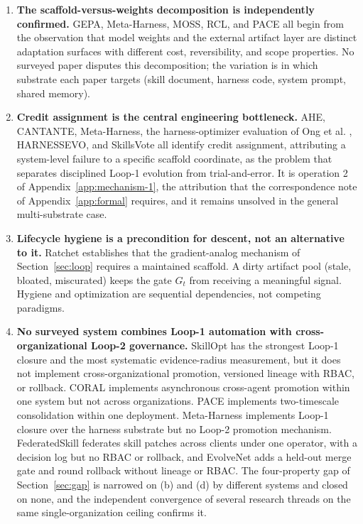 \documentclass[
  11pt,
]{article}
\newcounter{none} %
\begin{document}
\begin{enumerate}
\def\labelenumi{\arabic{enumi}.}
\item
  \textbf{The scaffold-versus-weights decomposition is independently confirmed.} GEPA, Meta-Harness, MOSS, RCL, and PACE all begin from the observation that model weights and the external artifact layer are distinct adaptation surfaces with different cost, reversibility, and scope properties. No surveyed paper disputes this decomposition; the variation is in which substrate each paper targets (skill document, harness code, system prompt, shared memory).
\item
  \textbf{Credit assignment is the central engineering bottleneck.} AHE, CANTANTE, Meta-Harness, the harness-optimizer evaluation of Ong et al. \cite{ong2026harnesseval}, HARNESSEVO, and SkillsVote all identify credit assignment, attributing a system-level failure to a specific scaffold coordinate, as the problem that separates disciplined Loop-1 evolution from trial-and-error. It is operation 2 of Appendix~\ref{app:mechanism-1}, the attribution that the correspondence note of Appendix~\ref{app:formal} requires, and it remains unsolved in the general multi-substrate case.
\item
  \textbf{Lifecycle hygiene is a precondition for descent, not an alternative to it.} Ratchet establishes that the gradient-analog mechanism of Section~\ref{sec:loop} requires a maintained scaffold. A dirty artifact pool (stale, bloated, miscurated) keeps the gate \(G_t\) from receiving a meaningful signal. Hygiene and optimization are sequential dependencies, not competing paradigms.
\item
  \textbf{No surveyed system combines Loop-1 automation with cross-organizational Loop-2 governance.} SkillOpt has the strongest Loop-1 closure and the most systematic evidence-radius measurement, but it does not implement cross-organizational promotion, versioned lineage with RBAC, or rollback. CORAL implements asynchronous cross-agent promotion within one system but not across organizations. PACE implements two-timescale consolidation within one deployment. Meta-Harness implements Loop-1 closure over the harness substrate but no Loop-2 promotion mechanism. FederatedSkill federates skill patches across clients under one operator, with a decision log but no RBAC or rollback, and EvolveNet adds a held-out merge gate and round rollback without lineage or RBAC. The four-property gap of Section~\ref{sec:gap} is narrowed on (b) and (d) by different systems and closed on none, and the independent convergence of several research threads on the same single-organization ceiling confirms it.
\end{enumerate}
\end{document}
